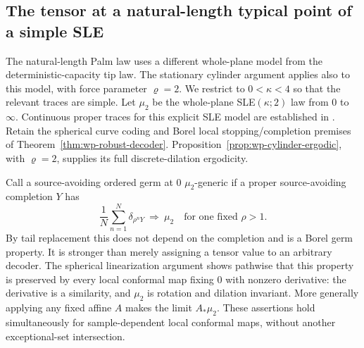 \documentclass[11pt]{article}
\theoremstyle{definition}\newtheorem{definition}[theorem]{Definition}
\theoremstyle{remark}\newtheorem{remark}[theorem]{Remark}
\begin{document}
\subsection{The tensor at a natural-length typical point of a simple SLE}
\label{sec:natural-point-tensor}

The natural-length Palm law uses a different whole-plane model from the
deterministic-capacity tip law. The stationary cylinder argument applies
also to this model, with force parameter $\varrho=2$.
We restrict to $0<\kappa<4$ so that the relevant traces are simple.
Let $\mu_2$ be the whole-plane SLE$(\kappa;2)$ law from $0$ to
$\infty$. Continuous proper traces for this explicit SLE model are established
in \cite[Theorem 1.12 and Proposition 2.5]{ms-ig4}. Retain the spherical
curve coding and Borel local stopping/completion premises of Theorem~\ref{thm:wp-robust-decoder}.
Proposition~\ref{prop:wp-cylinder-ergodic}, with $\varrho=2$, supplies
its full discrete-dilation ergodicity.

Call a source-avoiding ordered germ at $0$ $\mu_2$-generic if a proper
source-avoiding completion $Y$ has
\[
 \frac1N\sum_{n=1}^N\delta_{\rho^nY}\ \Longrightarrow\ \mu_2
 \quad\text{for one fixed }\rho>1.
 \tag{NP1}
\]
By tail replacement this does not depend on the completion and is a
Borel germ property. It is stronger than merely assigning a tensor
value to an arbitrary decoder. The spherical linearization argument
shows pathwise that this property is preserved by every local
conformal map fixing $0$ with nonzero derivative: the derivative is a
similarity, and $\mu_2$ is rotation and dilation invariant. More
generally applying any fixed affine $A$ makes the limit $A_*\mu_2$.
These assertions hold simultaneously for sample-dependent local
conformal maps, without another exceptional-set intersection.
\end{document}
